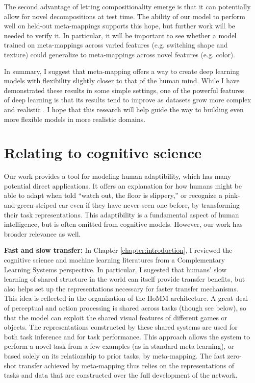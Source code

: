 The second advantage of letting compositionality emerge is that it can potentially allow for novel decompositions at test time. The ability of our model to perform well on held-out meta-mappings supports this hope, but further work will be needed to verify it. In particular, it will be important to see whether a model trained on meta-mappings across varied features (e.g. switching shape and texture) could generalize to meta-mappings across novel features (e.g. color).\par

In summary, I suggest that meta-mapping offers a way to create deep learning models with flexibility slightly closer to that of the human mind. While I have demonstrated these results in some simple settings, one of the powerful features of deep learning is that its results tend to improve as datasets grow more complex and realistic \citep{Hill2019a,Radford2019,Sutton2019}. I hope that this research will help guide the way to building even more flexible models in more realistic domains.  \par

\section{Relating to cognitive science}

Our work provides a tool for modeling human adaptibility, which has many potential direct applications. It offers an explanation for how humans might be able to adapt when told ``watch out, the floor is slippery,'' or recognize a pink-and-green striped car even if they have never seen one before, by transforming their task representations. This adaptibility is a fundamental aspect of human intelligence, but is often omitted from cognitive models. However, our work has broader relevance as well. \par 

\textbf{Fast and slow transfer:} In Chapter \ref{chapter:introduction}, I reviewed the cognitive science and machine learning literatures from a Complementary Learning Systems perspective. In particular, I sugested that humans' slow learning of shared structure in the world can itself provide transfer benefits, but also helps set up the representations necessary for faster transfer mechanisms. This idea is reflected in the organization of the HoMM architecture. A great deal of perceptual and action processing is shared across tasks (though see below), so that the model can exploit the shared visual features of different games or objects. The representations constructed by these shared systems are used for both task inference and for task performance. This approach allows the system to perform a novel task from a few examples (as in standard meta-learning), or based solely on its relationship to prior tasks, by meta-mapping. The fast zero-shot transfer achieved by meta-mapping thus relies on the representations of tasks and data that are constructed over the full development of the network. \par

